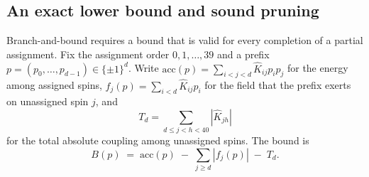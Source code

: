 \documentclass[11pt,a4paper]{article}
\theoremstyle{plain}
\theoremstyle{definition}
\theoremstyle{remark}
\begin{document}
\subsection{An exact lower bound and sound pruning}\label{sec:bound}
Branch-and-bound requires a bound that is valid for every completion of a partial assignment. Fix the assignment order $0,1,\dots,39$ and a prefix $p=(p_0,\dots,p_{d-1})\in\{\pm1\}^d$. Write $\mathrm{acc}(p)=\sum_{i<j<d}\hat K_{ij}p_ip_j$ for the energy among assigned spins, $f_j(p)=\sum_{i<d}\hat K_{ij}p_i$ for the field that the prefix exerts on unassigned spin $j$, and
\[
T_d=\sum_{d\le j<h<40}|\hat K_{jh}|
\]
for the total absolute coupling among unassigned spins. The bound is
\begin{equation}
B(p)\;=\;\mathrm{acc}(p)\;-\;\sum_{j\ge d}|f_j(p)|\;-\;T_d .
\label{eq:bound}
\end{equation}
\end{document}

